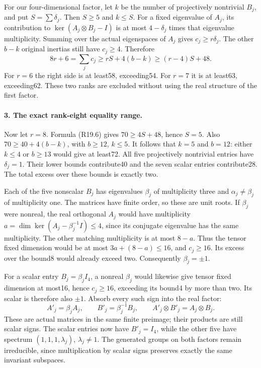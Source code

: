 For our four-dimensional factor, let \(k\) be the number
of projectively nontrivial \(B_j\), and put
\(S=\sum\delta_j\). Then \(S\ge5\) and \(k\le S\).
For a fixed eigenvalue of \(A_j\), its contribution to
\(\ker(A_j\otimes B_j-I)\) is at most
\(4-\delta_j\) times that eigenvalue multiplicity.
Summing over the actual eigenspaces of \(A_j\) gives
\(c_j\ge r\delta_j\). The other \(b-k\) original
inertias still have \(c_j\ge4\). Therefore
\[
 8r+6=\sum_jc_j\ge rS+4(b-k)
                         \ge(r-4)S+48.                 \tag{R19.6}
\]
For \(r=6\) the right side is at least58, exceeding54.
For \(r=7\) it is at least63, exceeding62.
These two ranks are excluded without using the real
structure of the first factor.

\paragraph{3. The exact rank-eight equality range.}
Now let \(r=8\). Formula (R19.6) gives
\(70\ge4S+48\), hence \(S=5\). Also
\(70\ge40+4(b-k)\), with \(b\ge12\), \(k\le5\).
It follows that \(k=5\) and \(b=12\): either \(k\le4\)
or \(b\ge13\) would give at least72. All five
projectively nontrivial entries have \(\delta_j=1\).
Their lower bounds contribute40 and the seven scalar
entries contribute28. The total excess over these
bounds is exactly two.

Each of the five nonscalar \(B_j\) has eigenvalues
\(\beta_j\) of multiplicity three and
\(\alpha_j\ne\beta_j\) of multiplicity one. The
matrices have finite order, so these are unit roots.
If \(\beta_j\) were nonreal, the real orthogonal
\(A_j\) would have multiplicity
\(a=\dim\ker(A_j-\beta_j^{-1}I)\le4\), since its
conjugate eigenvalue has the same multiplicity. The
other matching multiplicity is at most \(8-a\).
Thus the tensor fixed dimension would be at most
\(3a+(8-a)\le16\), and \(c_j\ge16\).
Its excess over the bound8 would already exceed two.
Consequently \(\beta_j=\pm1\).

For a scalar entry \(B_j=\beta_jI_4\), a nonreal
\(\beta_j\) would likewise give tensor fixed dimension
at most16, hence \(c_j\ge16\), exceeding its bound4
by more than two. Its scalar is therefore also \(\pm1\).
Absorb every such sign into the real factor:
\[
 A'_j=\beta_j A_j,\qquad B'_j=\beta_j^{-1}B_j,
                   \qquad A'_j\otimes B'_j=A_j\otimes B_j.
                                                               \tag{R19.7}
\]
These are actual matrices in the same finite preimage;
their products are still scalar signs. The scalar
entries now have \(B'_j=I_4\), while the other five
have spectrum \((1,1,1,\lambda_j)\), \(\lambda_j\ne1\).
The generated groups on both factors remain irreducible,
since multiplication by scalar signs preserves exactly
the same invariant subspaces.

